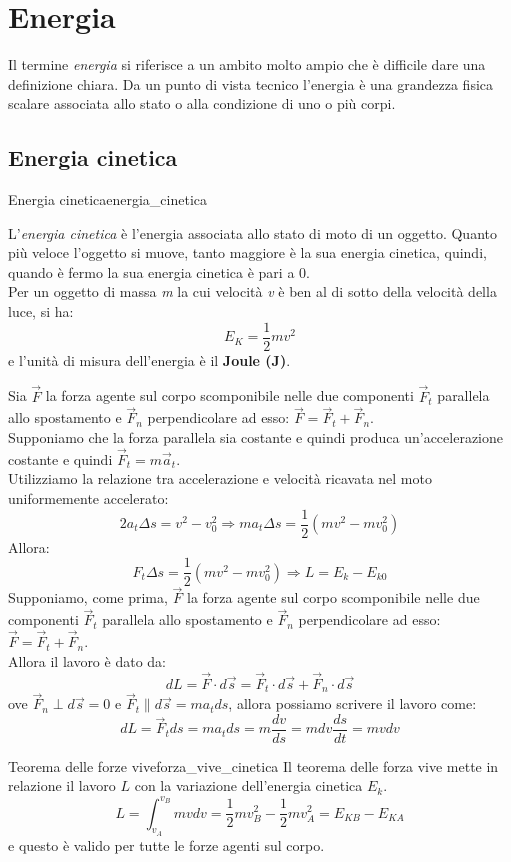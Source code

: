 \documentclass[12pt]{report}
\newcounter{theorem}
\newcounter{definition}
\newcommand{\nmu}{}
\begin{document}
	\section{Energia}
	Il termine \textit{energia} si riferisce a un ambito molto ampio che è difficile dare una definizione chiara. Da un punto di vista tecnico l'energia è una grandezza fisica scalare associata allo stato o alla condizione di uno o più corpi.
	\subsection{Energia cinetica}
	\begin{definition}{\nmu Energia cinetica}{energia_cinetica}

		L'\textit{energia cinetica} è l'energia associata allo stato di moto di un oggetto. Quanto più veloce l'oggetto si muove, tanto maggiore è la sua energia cinetica, quindi, quando è fermo la sua energia cinetica è pari a 0. \\
		Per un oggetto di massa \textit{m} la cui velocità \textit{v} è ben al di sotto della velocità della luce, si ha:
		\[
		E_K = \dfrac{1}{2}mv^2
		\]
		e l'unità di misura dell'energia è il \textbf{Joule (J)}.
	\end{definition}
	Sia $\vec{F}$ la forza agente sul corpo scomponibile nelle due componenti $\vec{F}_t$ parallela allo spostamento e $\vec{F}_n$ perpendicolare ad esso: $\vec{F} = \vec{F}_t + \vec{F}_n$. \\
	Supponiamo che la forza parallela sia costante e quindi produca un'accelerazione costante e quindi $\vec{F}_t = m\vec{a}_t$. \\
	Utilizziamo la relazione tra accelerazione e velocità ricavata nel moto uniformemente accelerato:
	\[
	2a_t\Delta s = v^2-v_0^2 \Rightarrow ma_t\Delta s = \dfrac{1}{2}(mv^2 - mv_0^2)
	\]
	Allora:
	\[
	F_t\Delta s = \dfrac{1}{2}(mv^2 - mv_0^2) \Rightarrow L = E_k - E_{k0}
	\]
	Supponiamo, come prima, $\vec{F}$ la forza agente sul corpo scomponibile nelle due componenti $\vec{F}_t$ parallela allo spostamento e $\vec{F}_n$ perpendicolare ad esso: $\vec{F} = \vec{F}_t  + \vec{F}_n$. \\
	Allora il lavoro è dato da:
	\[
	dL= \vec{F} \cdot d\vec{s} = \vec{F}_t \cdot d\vec{s} + \vec{F}_n \cdot d\vec{s}
	\]
	ove $\vec{F}_n \perp d\vec{s} = 0$ e $\vec{F}_t \parallel d\vec{s} = ma_tds$, allora possiamo scrivere il lavoro come:
	\[
	dL = \vec{F}_tds = ma_tds=m\dfrac{dv}{ds} = mdv\dfrac{ds}{dt} = mvdv
	\]
 	\begin{theorem}{\nmu Teorema delle forze vive}{forza_vive_cinetica}
		Il teorema delle forza vive mette in relazione il lavoro $L$ con la variazione dell'energia cinetica $E_k$.
		\[
		L = \int_{v_A}^{v_B}mvdv = \dfrac{1}{2}mv_B^2 - \dfrac{1}{2}mv_A^2 = E_{KB} - E_{KA}
		\]
		e questo è valido per tutte le forze agenti sul corpo.
	\end{theorem}
\end{document}
